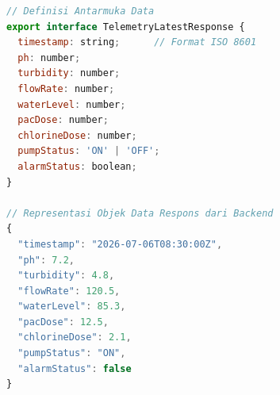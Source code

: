 \begin{minipage}{\textwidth}
\begin{lstlisting}[caption={Kontrak antarmuka struktur data dan representasi objek respons untuk telemetri terkini}, label={lst:telemetry-latest}, frame=single, captionpos=t, language=JavaScript]
// Definisi Antarmuka Data
export interface TelemetryLatestResponse {
  timestamp: string;      // Format ISO 8601
  ph: number;
  turbidity: number;
  flowRate: number;
  waterLevel: number;
  pacDose: number;
  chlorineDose: number;
  pumpStatus: 'ON' | 'OFF';
  alarmStatus: boolean;
}

// Representasi Objek Data Respons dari Backend
{
  "timestamp": "2026-07-06T08:30:00Z",
  "ph": 7.2,
  "turbidity": 4.8,
  "flowRate": 120.5,
  "waterLevel": 85.3,
  "pacDose": 12.5,
  "chlorineDose": 2.1,
  "pumpStatus": "ON",
  "alarmStatus": false
}
\end{lstlisting}
\end{minipage}
